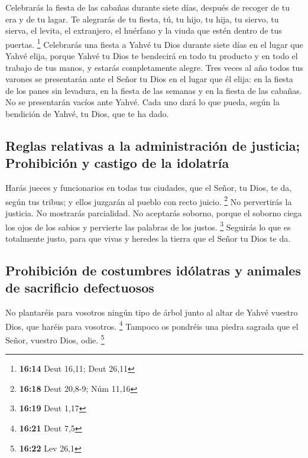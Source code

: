  Celebrarás la fiesta de las cabañas durante siete días,
después de recoger de tu era y de tu lagar.  Te alegrarás
de tu fiesta, tú, tu hijo, tu hija, tu siervo, tu sierva, el levita, el
extranjero, el huérfano y la viuda que estén dentro de tus puertas.
\footnote{\textbf{16:14} Deut 16,11; Deut 26,11} 
Celebrarás una fiesta a Yahvé tu Dios durante siete días en el lugar que
Yahvé elija, porque Yahvé tu Dios te bendecirá en todo tu producto y en
todo el trabajo de tus manos, y estarás completamente alegre.
 Tres veces al año todos tus varones se presentarán ante
el Señor tu Dios en el lugar que él elija: en la fiesta de los panes sin
levadura, en la fiesta de las semanas y en la fiesta de las cabañas. No
se presentarán vacíos ante Yahvé.  Cada uno dará lo que
pueda, según la bendición de Yahvé, tu Dios, que te ha dado.

\hypertarget{reglas-relativas-a-la-administraciuxf3n-de-justicia-prohibiciuxf3n-y-castigo-de-la-idolatruxeda}{%
\subsection{Reglas relativas a la administración de justicia;
Prohibición y castigo de la
idolatría}\label{reglas-relativas-a-la-administraciuxf3n-de-justicia-prohibiciuxf3n-y-castigo-de-la-idolatruxeda}}

 Harás jueces y funcionarios en todas tus ciudades, que
el Señor, tu Dios, te da, según tus tribus; y ellos juzgarán al pueblo
con recto juicio. \footnote{\textbf{16:18} Deut 20,8-9; Núm 11,16}
 No pervertirás la justicia. No mostrarás parcialidad. No
aceptarás soborno, porque el soborno ciega los ojos de los sabios y
pervierte las palabras de los justos. \footnote{\textbf{16:19} Deut 1,17}
 Seguirás lo que es totalmente justo, para que vivas y
heredes la tierra que el Señor tu Dios te da.

\hypertarget{prohibiciuxf3n-de-costumbres-iduxf3latras-y-animales-de-sacrificio-defectuosos}{%
\subsection{Prohibición de costumbres idólatras y animales de sacrificio
defectuosos}\label{prohibiciuxf3n-de-costumbres-iduxf3latras-y-animales-de-sacrificio-defectuosos}}

 No plantaréis para vosotros ningún tipo de árbol junto
al altar de Yahvé vuestro Dios, que haréis para vosotros. \footnote{\textbf{16:21}
  Deut 7,5}  Tampoco os pondréis una piedra sagrada que
el Señor, vuestro Dios, odie. \footnote{\textbf{16:22} Lev 26,1}

